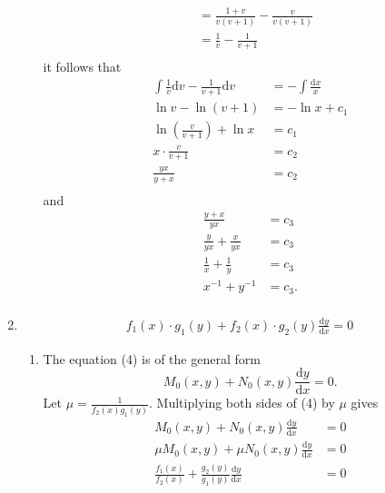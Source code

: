 \documentclass[10pt]{article}
\newcommand*{\dydx}[0]{\frac{\text{d}y}{\text{d}x}}
\newcommand*{\dx}[0]{\text{d}x}
\newcommand*{\dv}[0]{\text{d}v}
\begin{document}
\begin{enumerate}
\begin{enumerate}
\begin{align*}
                         &= \frac{1 + v}{v(v +1)} - \frac{v}{v(v +1)} \\
                         &= \frac{1}{v} - \frac{1}{v +1} \\
                    \end{align*}
                    it follows that
                    \begin{align*}
                        \int \frac{1}{v} \dv - \frac{1}{v +1} \dv &= - \int \frac{\dx}{x} \\
                        \ln v - \ln(v+1) &= -\ln x + c_1 \\
                        \ln\left(\frac{v}{v+1}\right) +\ln x &= c_1 \\
                        x\cdot\frac{v}{v+1} &= c_2 \\
                        \frac{yx}{y+x} &= c_2 \\
                    \end{align*}
                    and
                    \begin{align*}
                        \frac{y + x}{yx} &= c_3 \\
                        \frac{y}{yx} + \frac{x}{yx} &= c_3 \\
                        \frac{1}{x} + \frac{1}{y} &= c_3 \\
                        x^{-1} + y^{-1} &= c_3. \\
                    \end{align*}
            \end{enumerate}
        \item
            \begin{align}
                f_1(x) \cdot g_1(y) + f_2(x)\cdot g_2(y)\dydx = 0
            \end{align}
            \begin{enumerate}
                \item The equation (4) is of the general form
                    $$M_0(x,y) + N_0(x,y)\dydx = 0.$$
                    Let $\mu = \frac{1}{f_2(x)g_1(y)}$.
                    Multiplying both sides of (4) by $\mu$ gives
                    \begin{align*}
                        M_0(x,y) + N_0(x,y)\dydx &= 0 \\
                        \mu M_0(x,y) + \mu N_0(x,y) \dydx &= 0 \\
                        \frac{f_1(x)}{f_2(x)} + \frac{g_2(y)}{g_1(y)}\dydx &= 0 \\

\end{align*}
\end{enumerate}
\end{enumerate}
\end{document}
